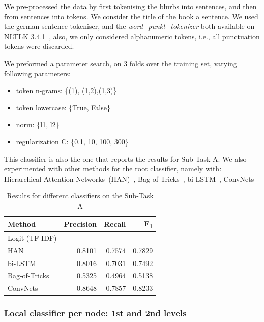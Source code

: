 \documentclass[11pt,a4paper]{article}
\begin{document}
We pre-processed the data by first tokenising the blurbs into sentences, and then
from sentences into tokens. We consider the title of the book a sentence. We used
the german sentence tokeniser, and the \textit {word\_punkt\_tokenizer} both available
on NLTLK 3.4.1~\cite{Bird:2009:NLP:1717171}, also, we only considered alphanumeric
tokens, i.e., all punctuation tokens were discarded.


We preformed a parameter search, on 3 folds over the training set, varying following parameters:

\begin{itemize}
\item token n-grams: \{(1), (1,2),(1,3)\}
\item token lowercase: \{True, False\}
\item norm: \{l1, l2\}
\item regularization C: \{0.1, 10, 100, 300\}
\end{itemize}

This classifier is also the one that reports the results for Sub-Task A. We also experimented with
other methods for the root classifier, namely with: Hierarchical Attention Networks~(HAN)~\cite{yang-etal-2016-hierarchical},
Bag-of-Tricks~\cite{joulin-etal-2017-bag}, bi-LSTM~\cite{Hochreiter:1997:LSM:1246443.1246450}, ConvNets~\cite{kim-2014-convolutional}


\begin{table}
\begin{center}
\begin{tabular}{|l|r|r|r|}
\hline\centering\textbf{Method}  & \textbf{Precision} &  \textbf{Recall} &  \textbf{F\textsubscript{1}}\\
\hline
 Logit (TF-IDF) &        &        &        \\
 HAN            & 0.8101 & 0.7574 & 0.7829 \\
 bi-LSTM        & 0.8016 & 0.7031 & 0.7492 \\
 Bag-of-Tricks  & 0.5325 & 0.4964 & 0.5138 \\
 ConvNets       & 0.8648 & 0.7857 & 0.8233 \\
\hline
\end{tabular}
\end{center}
\caption{\label{devset-results} Results for different classifiers on the Sub-Task A}
\end{table}

\subsubsection{Local classifier per node: 1st and 2nd levels}
\end{document}
